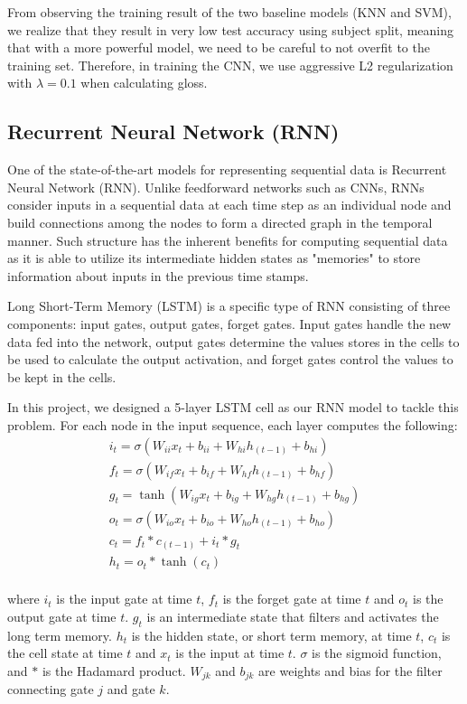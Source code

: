 \documentclass{article}
\begin{document}
\begin{multicols*}{2}
From observing the training result of the two baseline models (KNN and SVM), we realize that they result in very low test accuracy using subject split, meaning that with a more powerful model, we need to be careful to not overfit to the training set. Therefore, in training the CNN, we use aggressive L2 regularization with $\lambda = 0.1$ when calculating gloss. 

\subsection{Recurrent Neural Network (RNN)}

One of the state-of-the-art models for representing sequential data is Recurrent Neural Network (RNN). Unlike feedforward networks such as CNNs, RNNs consider inputs in a sequential data at each time step as an individual node and build connections among the nodes to form a directed graph in the temporal manner. Such structure has the inherent benefits for computing sequential data as it is able to utilize its intermediate hidden states as "memories" to store information about inputs in the previous time stamps.

Long Short-Term Memory (LSTM)\cite{lstm} is a specific type of RNN consisting of three components: input gates, output gates, forget gates. Input gates handle the new data fed into the network, output gates determine the values stores in the cells to be used to calculate the output activation, and forget gates control the values to be kept in the cells.

In this project, we designed a 5-layer LSTM cell as our RNN model to tackle this problem. For each node in the input sequence, each layer computes the following:
\[
\begin{array}{ll} 
    i_t = \sigma(W_{ii} x_t + b_{ii} + W_{hi} h_{(t-1)} + b_{hi}) \\
    f_t = \sigma(W_{if} x_t + b_{if} + W_{hf} h_{(t-1)} + b_{hf}) \\
    g_t = \tanh(W_{ig} x_t + b_{ig} + W_{hg} h_{(t-1)} + b_{hg}) \\
    o_t = \sigma(W_{io} x_t + b_{io} + W_{ho} h_{(t-1)} + b_{ho}) \\
    c_t = f_t * c_{(t-1)} + i_t * g_t \\
    h_t = o_t * \tanh(c_t) \\
\end{array}
\]

where $i_t$ is the input gate at time $t$, $f_t$ is the forget gate at time $t$ and $o_t$ is the output gate at time $t$. $g_t$ is an intermediate state that filters and activates the long term memory. $h_t$ is the hidden state, or short term memory, at time $t$, $c_t$ is the cell state at time $t$ and $x_t$ is the input at time $t$. $\sigma$ is the sigmoid function, and $*$ is the Hadamard product. $W_{jk}$ and $b_{jk}$ are weights and bias for the filter connecting gate $j$ and gate $k$.


\end{multicols*}
\end{document}
